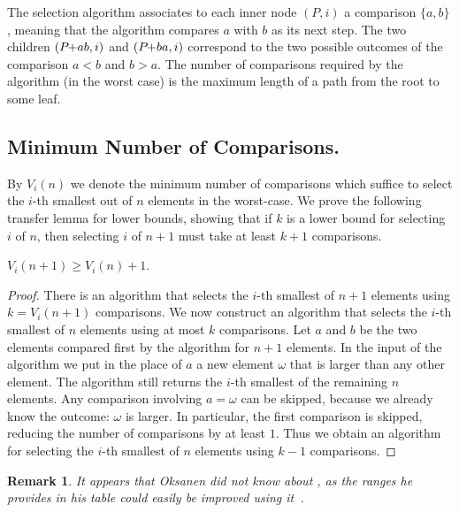 \documentclass[twoside,leqno,twocolumn]{article}
\newcommand{\pchild}[3]{{#1}\kern-1pt{+}{#2}{#3}}
\newtheorem{remark}{Remark}[section]
\begin{document}
The selection algorithm associates to each inner node $(P, i)$ a comparison $\{a, b\}$, meaning that the algorithm compares $a$ with $b$ as its next step.
The two children $(\pchild{P}{a}{b}, i)$ and $(\pchild{P}{b}{a}, i)$ correspond to the two possible outcomes of the comparison $a < b$ and $b > a$.
The number of comparisons required by the algorithm (in the worst case) is the maximum length of a path from the root to some leaf.


\subsection{Minimum Number of Comparisons.}

By $V_i(n)$ we denote the minimum number of comparisons which suffice to select the $i$-th smallest out of $n$ elements in the worst-case.
We prove the following transfer lemma for lower bounds, showing that if $k$ is a lower bound for selecting $i$ of $n$, then selecting $i$ of $n + 1$ must take at least $k + 1$ comparisons.

\begin{lemma} \label{lemma:previous_next_poset}
  $V_i(n + 1) \ge V_i(n) + 1$.
\end{lemma}

\begin{proof}
  There is an algorithm that selects the $i$-th smallest of $n + 1$ elements using $k = V_i(n + 1)$ comparisons.
  We now construct an algorithm that selects the $i$-th smallest of $n$ elements using at most $k$ comparisons.
  Let $a$ and $b$ be the two elements compared first by the algorithm for $n + 1$ elements.
  In the input of the algorithm we put in the place of $a$ a new element $\omega$ that is larger than any other element.
  The algorithm still returns the $i$-th smallest of the remaining $n$ elements.
  Any comparison involving $a = \omega$ can be skipped, because we already know the outcome: $\omega$ is larger.
  In particular, the first comparison is skipped, reducing the number of comparisons by at least $1$.
  Thus we obtain an algorithm for selecting the $i$-th smallest of $n$ elements using $k - 1$ comparisons.
\end{proof}

\begin{remark}
  It appears that Oksanen did not know about , as the ranges he provides in his table could easily be improved using it~\cite{Oksanen}.
\end{remark}
\end{document}
